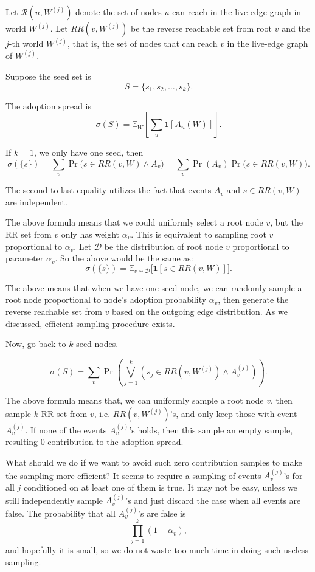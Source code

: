 \documentclass[11pt]{article}
\begin{document}
Let $\mathcal{R}(u, W^{(j)})$ denote the set of nodes $u$ can reach in the live-edge graph in world $W^{(j)}$. Let $RR(v, W^{(j)})$ be the reverse reachable set from root $v$ and the $j$-th world $W^{(j)}$, that is, the set of nodes that can reach $v$ in the live-edge graph of $W^{(j)}$.

Suppose the seed set is
\[
S = \{s_1, s_2, \dots, s_k\}.
\]

The adoption spread is
\[
\sigma(S) = \mathbb{E}_W \left[ \sum_{u} \mathbf{1}[A_u(W)] \right].
\]

If $k=1$, we only have one seed, then
\[
\sigma(\{s\})
= \sum_{v} \Pr\bigl( s \in RR(v, W) \wedge A_v \bigr)
= \sum_{v} \Pr(A_v)\Pr\bigl(s \in RR(v, W)\bigr).
\]

The second to last equality utilizes the fact that events $A_v$ and $s \in RR(v, W)$ are independent.

The above formula means that we could uniformly select a root node $v$, but the RR set from $v$ only has weight $\alpha_v$. This is equivalent to sampling root $v$ proportional to $\alpha_v$. Let $\mathcal{D}$ be the distribution of root node $v$ proportional to parameter $\alpha_v$. So the above would be the same as:
\[
\sigma(\{s\}) = \mathbb{E}_{v \sim \mathcal{D}} \bigl[ \mathbf{1}[s \in RR(v,W)] \bigr].
\]

The above means that when we have one seed node, we can randomly sample a root node proportional to node's adoption probability $\alpha_v$, then generate the reverse reachable set from $v$ based on the outgoing edge distribution. As we discussed, efficient sampling procedure exists.

Now, go back to $k$ seed nodes.

\[
\sigma(S)
= \sum_{v} \Pr\left(
\bigvee_{j=1}^k
\left(
s_j \in RR(v, W^{(j)}) \wedge A_v^{(j)}
\right)
\right).
\tag{*}
\]

The above formula means that, we can uniformly sample a root node $v$, then sample $k$ RR set from $v$, i.e. $RR(v,W^{(j)})$'s, and only keep those with event $A_v^{(j)}$. If none of the events $A_v^{(j)}$'s holds, then this sample an empty sample, resulting 0 contribution to the adoption spread.

What should we do if we want to avoid such zero contribution samples to make the sampling more efficient? It seems to require a sampling of events $A_v^{(j)}$'s for all $j$ conditioned on at least one of them is true. It may not be easy, unless we still independently sample $A_v^{(j)}$'s and just discard the case when all events are false. The probability that all $A_v^{(j)}$'s are false is
\[
\prod_{j=1}^k (1-\alpha_v),
\]
and hopefully it is small, so we do not waste too much time in doing such useless sampling.
\end{document}
